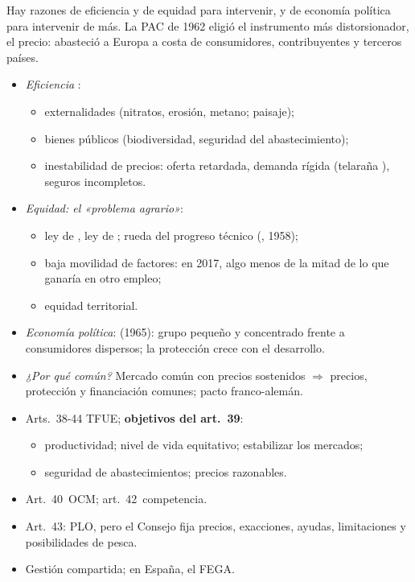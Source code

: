 \documentclass{article}
\begin{document}
\begin{columnas}
\begin{ideaclave}
Hay razones de eficiencia y de equidad para intervenir, y de economía política para intervenir de más. La PAC de 1962 eligió el instrumento más distorsionador, el precio: abasteció a Europa a costa de consumidores, contribuyentes y terceros países.
\end{ideaclave}

\begin{itemize}
\item \emph{Eficiencia} :
  \begin{itemize}
  \item externalidades (nitratos, erosión, metano; paisaje);
  \item bienes públicos (biodiversidad, seguridad del abastecimiento);
  \item inestabilidad de precios: oferta retardada, demanda rígida (telaraña ), seguros incompletos.
  \end{itemize}
\item \emph{Equidad: el «problema agrario»}:
  \begin{itemize}
  \item ley de , ley de ; rueda del progreso técnico (, 1958);
  \item baja movilidad de factores: en 2017, algo menos de la mitad de lo que ganaría en otro empleo;
  \item equidad territorial.
  \end{itemize}
\item \emph{Economía política}:  (1965): grupo pequeño y concentrado frente a consumidores dispersos; la protección crece con el desarrollo.
\item \emph{¿Por qué común?} Mercado común con precios sostenidos $\Rightarrow$ precios, protección y financiación comunes; pacto franco-alemán.
\end{itemize}
\begin{itemize}
\item Arts.~38-44 TFUE; \textbf{objetivos del art.~39}:
  \begin{itemize}
  \item productividad; nivel de vida equitativo; estabilizar los mercados;
  \item seguridad de abastecimientos; precios razonables.
  \end{itemize}
\item Art.~40~OCM; art.~42~competencia.
\item Art.~43: PLO, pero el Consejo fija precios, exacciones, ayudas, limitaciones y posibilidades de pesca.
\item Gestión compartida; en España, el FEGA.
\end{itemize}


\end{columnas}
\end{document}
